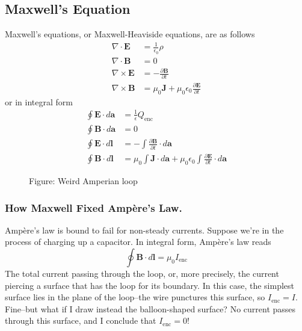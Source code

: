 \documentclass[../../../main.tex]{subfiles}
\begin{document}
\subsection*{Maxwell's Equation}
Maxwell's equations, or Maxwell-Heaviside equations, are as follows
\begin{align*}
    \nabla\cdot\mathbf{E}&=\frac{1}{\epsilon_0}\rho\\
    \nabla\cdot\mathbf{B}&=0\\
    \nabla\times\mathbf{E}&=-\frac{\partial \mathbf{B}}{\partial t}\\
    \nabla\times\mathbf{B}&=\mu_0\mathbf{J}+\mu_0\epsilon_0\frac{\partial \mathbf{E}}{\partial t}
\end{align*}
or in integral form 
\begin{align*}
    \oint \mathbf{E}\cdot d\mathbf{a}&=\frac{1}{\epsilon}Q_\text{enc}\\
    \oint \mathbf{B}\cdot d\mathbf{a}&=0\\
    \oint \mathbf{E}\cdot d\mathbf{l}&=-\int \frac{\partial \mathbf{B}}{\partial t}\cdot d\mathbf{a}\\
    \oint \mathbf{B}\cdot d\mathbf{l}&=\mu_0\int\mathbf{J}\cdot d\mathbf{a}+ \mu_0\epsilon_0 \int\frac{\partial \mathbf{E}}{\partial t}\cdot d\mathbf{a}
\end{align*}

\begin{figure}[b]
    \centering
    \caption*{Figure: Weird Amperian loop}
\end{figure}

\subsubsection*{How Maxwell Fixed Ampère’s Law.} Ampère’s law is bound to fail for non-steady currents. Suppose we’re in the process of charging up a capacitor. In integral form, Ampère’s law reads
\begin{equation*}
    \oint \mathbf{B}\cdot d\mathbf{l}=\mu_0 I_\text{enc}
\end{equation*}
The total current passing through the loop, or, more precisely, the current piercing a surface that has the loop for its boundary. In this case, the simplest surface lies in the plane of the loop--the wire punctures this surface, so $I_\text{enc} = I$. Fine--but what if I draw instead the balloon-shaped surface? No current passes through this surface, and I conclude that $I_\text{enc} = 0$!
\end{document}
